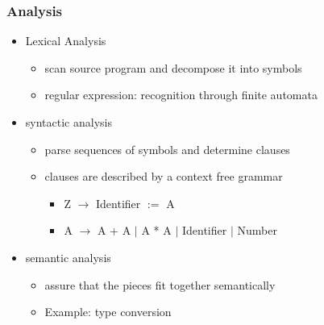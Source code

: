 \subsubsection{Analysis}
\begin{itemize}
	\item Lexical Analysis
\begin{itemize}
	\item scan source program and decompose it into symbols 
	\item regular expression: recognition through finite automata 
\end{itemize}
\item syntactic analysis
\begin{itemize}
	\item parse sequences of symbols and determine clauses
	\item clauses are described by a context free grammar
\begin{itemize}
	\item Z $\rightarrow$ Identifier $:=$ A
	\item A $\rightarrow$ A + A $|$ A * A $|$ Identifier $|$ Number
\end{itemize}
\end{itemize}
\item semantic analysis
\begin{itemize}
	\item assure that the pieces fit together semantically
	\item Example: type conversion
\end{itemize}
\end{itemize}

